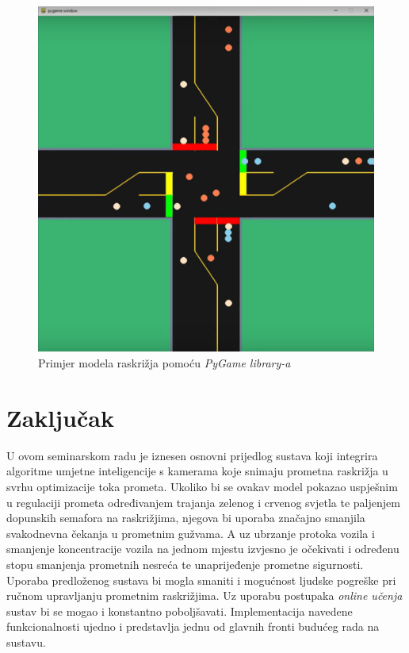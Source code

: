 \documentclass[seminarski, times, utf8]{fer}
\begin{document}
\begin{figure}[H]
   \centering
   \includegraphics[width=0.7\linewidth]{slike/img3.png}
   \caption{Primjer modela raskrižja pomoću \textit{PyGame library-a}}
   \label{fig:pygame}
\end{figure}
  

\chapter{Zaključak}
\label{pog:zakljucak}
U ovom seminarskom radu je iznesen osnovni prijedlog sustava koji integrira algoritme umjetne inteligencije s kamerama koje snimaju prometna raskrižja u svrhu optimizacije toka prometa. Ukoliko bi se ovakav model pokazao uspješnim u regulaciji prometa određivanjem trajanja zelenog i crvenog svjetla te paljenjem dopunskih semafora na raskrižjima, njegova bi uporaba značajno smanjila svakodnevna čekanja u prometnim gužvama. A uz ubrzanje protoka vozila i smanjenje koncentracije vozila na jednom mjestu izvjesno je očekivati i određenu stopu smanjenja prometnih nesreća te unaprijeđenje prometne sigurnosti. Uporaba predloženog sustava bi mogla smaniti i mogućnost ljudske pogreške pri ručnom upravljanju prometnim raskrižjima. Uz uporabu postupaka \textit{online učenja} sustav bi se mogao i konstantno poboljšavati. Implementacija navedene funkcionalnosti ujedno i predstavlja jednu od glavnih fronti budućeg rada na sustavu.




\end{document}
